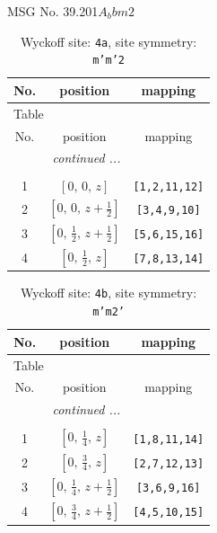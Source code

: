 \documentclass[fleqn,8pt]{jsarticle}
\begin{document}
\setcounter{MaxMatrixCols}{32}

\renewcommand{\tablename}{Table~}
\renewcommand{\figurename}{Figure~}
\begin{center}
\LARGE
MSG No. 39.201\quad$A_{b}bm2$
\end{center}
\renewcommand{\arraystretch}{1.2}
\begin{longtable}{ccc}
\caption{Wyckoff site: {\tt 4a}, site symmetry: {\tt m'm'2}}
 \\
 \hline \hline
No. & position & mapping \\ \hline \endfirsthead

\multicolumn{2}{l}{\tablename\ \thetable{}} \\
 \hline \hline
No. & position & mapping \\ \hline \endhead

 \hline \hline
\multicolumn{2}{r}{\footnotesize\it continued ...} \\ \endfoot

 \hline \hline
\multicolumn{2}{r}{} \\ \endlastfoot

1 & $\left[ 0,\, 0,\, z \right]$ & {\tt [1,2,11,12]} \\ \hline
2 & $\left[ 0,\, 0,\, z + \frac{1}{2} \right]$ & {\tt [3,4,9,10]} \\ \hline
3 & $\left[ 0,\, \frac{1}{2},\, z + \frac{1}{2} \right]$ & {\tt [5,6,15,16]} \\ \hline
4 & $\left[ 0,\, \frac{1}{2},\, z \right]$ & {\tt [7,8,13,14]} \\
\end{longtable}
\renewcommand{\arraystretch}{1.2}
\begin{longtable}{ccc}
\caption{Wyckoff site: {\tt 4b}, site symmetry: {\tt m'm2'}}
 \\
 \hline \hline
No. & position & mapping \\ \hline \endfirsthead

\multicolumn{2}{l}{\tablename\ \thetable{}} \\
 \hline \hline
No. & position & mapping \\ \hline \endhead

 \hline \hline
\multicolumn{2}{r}{\footnotesize\it continued ...} \\ \endfoot

 \hline \hline
\multicolumn{2}{r}{} \\ \endlastfoot

1 & $\left[ 0,\, \frac{1}{4},\, z \right]$ & {\tt [1,8,11,14]} \\ \hline
2 & $\left[ 0,\, \frac{3}{4},\, z \right]$ & {\tt [2,7,12,13]} \\ \hline
3 & $\left[ 0,\, \frac{1}{4},\, z + \frac{1}{2} \right]$ & {\tt [3,6,9,16]} \\ \hline
4 & $\left[ 0,\, \frac{3}{4},\, z + \frac{1}{2} \right]$ & {\tt [4,5,10,15]} \\
\end{longtable}
\end{document}
